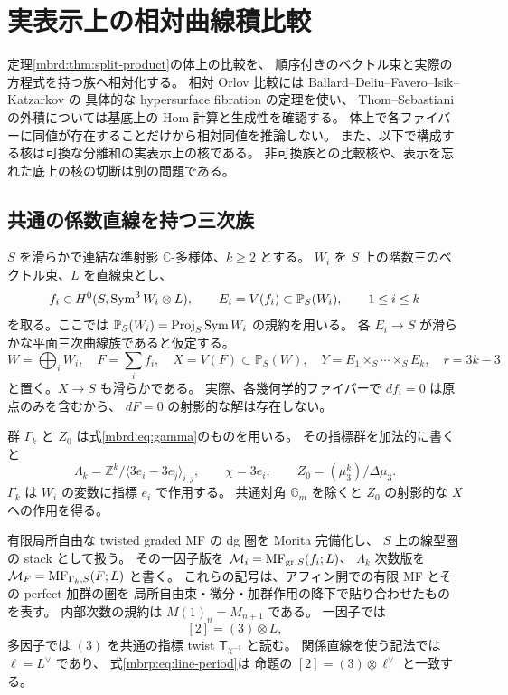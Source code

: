 \section{実表示上の相対曲線積比較}
\label{mbrp:sec:relative-product}

定理\ref{mbrd:thm:split-product}の体上の比較を、
順序付きのベクトル束と実際の方程式を持つ族へ相対化する。
相対 Orlov 比較には Ballard--Deliu--Favero--Isik--Katzarkov の
具体的な hypersurface fibration の定理を使い、
Thom--Sebastiani の外積については基底上の Hom 計算と生成性を確認する。
体上で各ファイバーに同値が存在することだけから相対同値を推論しない。
また、以下で構成する核は可換な分離和の実表示上の核である。
非可換族との比較核や、表示を忘れた底上の核の切断は別の問題である。

\subsection{共通の係数直線を持つ三次族}

$S$ を滑らかで連結な準射影 $\mathbb C$-多様体、$k\geq2$ とする。
$W_i$ を $S$ 上の階数三のベクトル束、$L$ を直線束とし、
\begin{equation}\label{mbrp:eq:data}
 f_i\in H^0(S,\operatorname{Sym}^3W_i\otimes L),\qquad
 E_i=V(f_i)\subset\mathbb P_S(W_i),\qquad 1\leq i\leq k
\end{equation}
を取る。ここでは $\mathbb P_S(W_i)=\operatorname{Proj}_S\operatorname{Sym} W_i$ の規約を用いる。
各 $E_i\to S$ が滑らかな平面三次曲線族であると仮定する。
\[
 W=\bigoplus_iW_i,\quad F=\sum_i f_i,\quad
 X=V(F)\subset\mathbb P_S(W),\quad
 Y=E_1\times_S\cdots\times_SE_k,\quad r=3k-3
\]
と置く。$X\to S$ も滑らかである。
実際、各幾何学的ファイバーで $d f_i=0$ は原点のみを含むから、
$dF=0$ の射影的な解は存在しない。

群 $\Gamma_k$ と $Z_0$ は式\eqref{mbrd:eq:gamma}のものを用いる。
その指標群を加法的に書くと
\begin{equation}\label{mbrp:eq:lattice}
 \Lambda_k=\mathbb Z^k/
    \langle3e_i-3e_j\rangle_{i,j},\qquad
 \chi=3e_i,\qquad Z_0=(\mu_3^k)/\Delta\mu_3.
\end{equation}
$\Gamma_k$ は $W_i$ の変数に指標 $e_i$ で作用する。
共通対角 $\mathbb G_m$ を除くと $Z_0$ の射影的な $X$ への作用を得る。

有限局所自由な twisted graded MF の dg 圏を Morita 完備化し、
$S$ 上の線型圏の stack として扱う。
その一因子版を $\mathcal M_i=\operatorname{MF}_{\mathrm{gr},S}(f_i;L)$、
$\Lambda_k$ 次数版を $\mathcal M_F=\operatorname{MF}_{\Gamma_k,S}(F;L)$ と書く。
これらの記号は、アフィン開での有限 MF とその perfect 加群の圏を
局所自由束・微分・加群作用の降下で貼り合わせたものを表す。
内部次数の規約は $M(1)_n=M_{n+1}$ である。
一因子では
\begin{equation}\label{mbrp:eq:line-period}
 [2]=(3)\otimes L,
\end{equation}
多因子では $(3)$ を共通の指標 twist
$\mathsf T_{\chi^{-1}}$ と読む。
関係直線を使う記法では $\ell=L^\vee$ であり、
式\eqref{mbrp:eq:line-period}は
命題の $[2]=(3)\otimes\ell^\vee$ と一致する。

